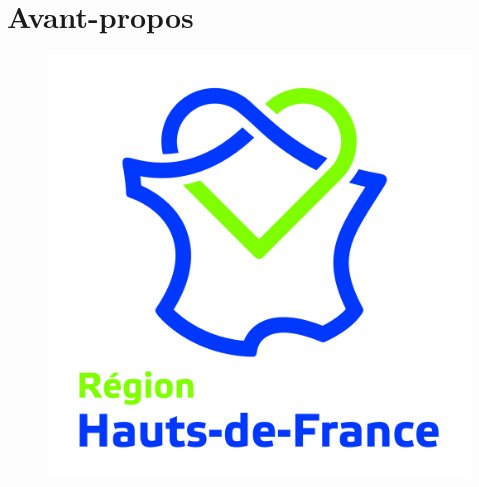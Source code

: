     \cleardoublepage
\section*{Avant-propos
    \label{body:avant-propos}
    }

\begin{figure} %
    \vspace{-10pt} %
    \includegraphics[width=\linewidth]{src/Figures/Introduction/Logo_HdF.jpg} 
    \caption*{}
    \label{fig-introduction:logo-hdf}
\end{figure}

